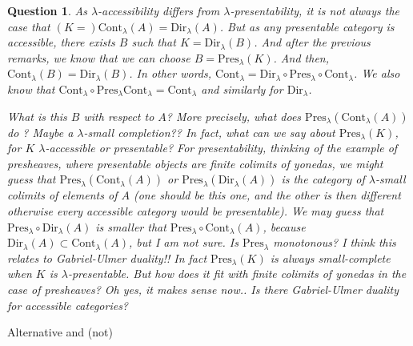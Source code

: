 \documentclass{article}
\newcommand{\Cont}[1]{\text{Cont}_{#1}}
\newcommand{\Dir}[1]{\text{Dir}_{#1}}
\newcommand{\Pres}[1]{\text{Pres}_{#1}}
\newtheorem{question}[theorem]{Question}
\begin{document}
  \begin{question}
	   As $\lambda$-accessibility differs from $\lambda$-presentability, it is not always the case that 
	   $(K =) \Cont\lambda(A)=\Dir\lambda(A)$. But as any presentable category is accessible, there exists $B$ such that $K = \Dir\lambda(B)$. And after the previous remarks, we know that we can choose $B = \Pres\lambda(K)$. And then, $\Cont\lambda(B) = \Dir\lambda(B)$.
	   In other words, $\Cont\lambda = 
	   \Dir\lambda \circ \Pres\lambda \circ \Cont\lambda$.
	   We also know that $\Cont\lambda\circ\Pres\lambda\Cont\lambda = \Cont\lambda$
	   and similarly for $\Dir\lambda$.

	   What is this $B$ with respect to $A$?
	   More precisely, what does $\Pres\lambda(\Cont\lambda(A))$ do ?
	   Maybe a $\lambda$-small completion??
	   In fact, what can we say about $\Pres\lambda(K)$, for $K$ $\lambda$-accessible or presentable? For presentability, thinking of the example of presheaves, where presentable objects are finite colimits of yonedas, we might guess that $\Pres\lambda(\Cont\lambda(A))$ or $\Pres\lambda(\Dir\lambda(A))$ is the category of $\lambda$-small colimits of elements of $A$ (one should be this one, and the other is then different otherwise every accessible category would be presentable).
	   We may guess that $\Pres\lambda\circ\Dir\lambda(A)$ is smaller that $\Pres\lambda\circ\Cont\lambda(A)$, because $\Dir\lambda(A) \subset \Cont\lambda(A)$, but I am not sure. Is $\Pres\lambda$ monotonous?
	   I think this relates to Gabriel-Ulmer duality!! In fact $\Pres\lambda(K)$ is always small-complete when $K$ is $\lambda$-presentable. But how does it fit with finite colimits of yonedas in the case of presheaves? Oh yes, it makes sense now.. Is there Gabriel-Ulmer duality for accessible categories?
  \end{question}
  Alternative and (not)
\end{document}

